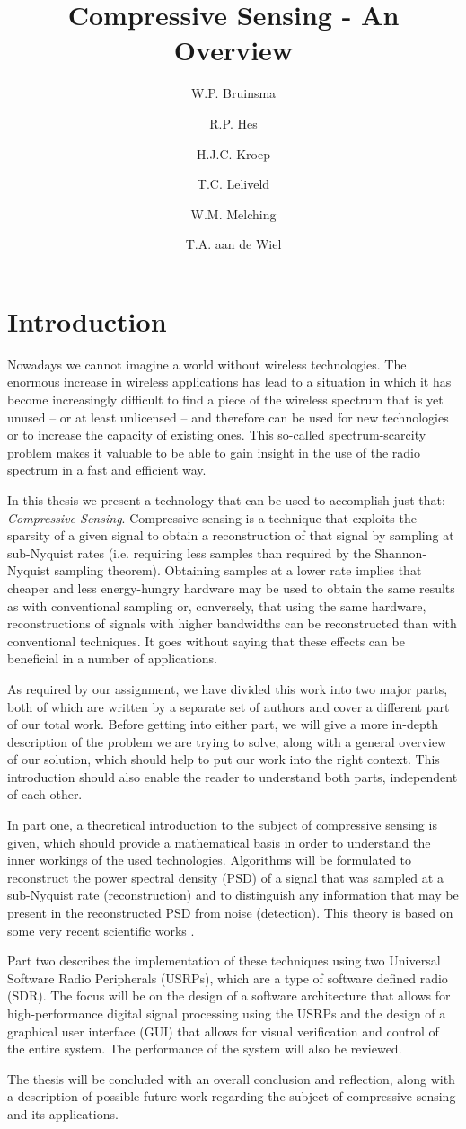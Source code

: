 \documentclass[a4paper, openany, oneside]{memoir}
\title{Compressive Sensing - An Overview}
\author{W.P. Bruinsma \and R.P. Hes \and H.J.C. Kroep \and T.C. Leliveld \and W.M. Melching \and T.A. aan de Wiel}
\begin{document}
\chapter{Introduction}
Nowadays we cannot imagine a world without wireless technologies. The enormous increase in wireless applications has lead to a situation in which it has become increasingly difficult to find a piece of the wireless spectrum that is yet unused -- or at least unlicensed -- and therefore can be used for new technologies or to increase the capacity of existing ones. This so-called spectrum-scarcity problem makes it valuable to be able to gain insight in the use of the radio spectrum in a fast and efficient way.

In this thesis we present a technology that can be used to accomplish just that: \emph{Compressive Sensing}. Compressive sensing is a technique that exploits the sparsity of a given signal to obtain a reconstruction of that signal by sampling at sub-Nyquist rates (i.e. requiring less samples than required by the Shannon-Nyquist sampling theorem). Obtaining samples at a lower rate implies that cheaper and less energy-hungry hardware may be used to obtain the same results as with conventional sampling or, conversely, that using the same hardware, reconstructions of signals with higher bandwidths can be reconstructed than with conventional techniques. It goes without saying that these effects can be beneficial in a number of applications.

As required by our assignment, we have divided this work into two major parts, both of which are written by a separate set of authors and cover a different part of our total work. Before getting into either part, we will give a more in-depth description of the problem we are trying to solve, along with a general overview of our solution, which should help to put our work into the right context. This introduction should also enable the reader to understand both parts, independent of each other.

In part one, a theoretical introduction to the subject of compressive sensing is given, which should provide a mathematical basis in order to understand the inner workings of the used technologies. Algorithms will be formulated to reconstruct the power spectral density (PSD) of a signal that was sampled at a sub-Nyquist rate (reconstruction) and to distinguish any information that may be present in the reconstructed PSD from noise (detection). This theory is based on some very recent scientific works \cite{ariananda2011multicoset, ariananda2012compressive}.

Part two describes the implementation of these techniques using two Universal Software Radio Peripherals (USRPs), which are a type of software defined radio (SDR). The focus will be on the design of a software architecture that allows for high-performance digital signal processing using the USRPs and the design of a graphical user interface (GUI) that allows for visual verification and control of the entire system. The performance of the system will also be reviewed.

The thesis will be concluded with an overall conclusion and reflection, along with a description of possible future work regarding the subject of compressive sensing and its applications.
\end{document}

